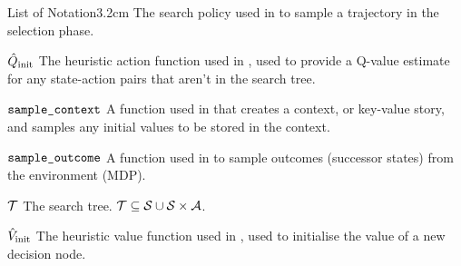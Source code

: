 \begin{mclistof}{List of Notation}{3.2cm}
        The search policy used in \thtspp\ewe to sample a trajectory in the selection phase.
    \item[${\hat{Q}_{\textnormal{init}}}$]
        The heuristic action function used in \thtspp, used to provide a Q-value estimate for any state-action pairs that aren't in the search tree.
    \item[${\textnormal{\texttt{sample\_context}}}$]
        A function used in \thtspp\ewe that creates a context, or key-value story, and samples any initial values to be stored in the context.
    \item[${\textnormal{\texttt{sample\_outcome}}}$]
        A function used in \thtspp\ewe to sample outcomes (successor states) from the environment (MDP).
    \item[$\mathcal{T}$] 
        The \thtspp\ewe search tree. $\mathcal{T}\subseteq \mathcal{S} \cup \mathcal{S}\times\mathcal{A}$. 
    \item[${\hat{V}_{\textnormal{init}}}$]
        The heuristic value function used in \thtspp, used to initialise the value of a new decision node. 

\end{mclistof}
